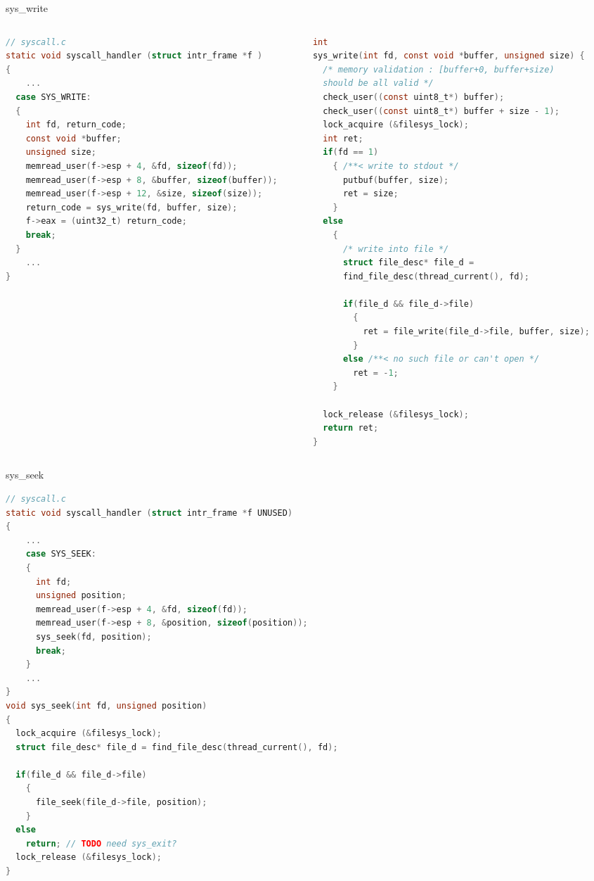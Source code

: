 \documentclass[10pt]{beamer}
\begin{document}
\begin{frame}[fragile]{sys\_write}
\begin{columns}
\begin{column}{0.5\textwidth}
\begin{lstlisting}[language=C]
// syscall.c
static void syscall_handler (struct intr_frame *f ) 
{
    ...
  case SYS_WRITE:
  {
    int fd, return_code;
    const void *buffer;
    unsigned size;
    memread_user(f->esp + 4, &fd, sizeof(fd));
    memread_user(f->esp + 8, &buffer, sizeof(buffer));
    memread_user(f->esp + 12, &size, sizeof(size));
    return_code = sys_write(fd, buffer, size);
    f->eax = (uint32_t) return_code;
    break;
  }
    ...
}
\end{lstlisting}
\end{column}
\begin{column}{0.5\textwidth}
\begin{lstlisting}[language=C]
int 
sys_write(int fd, const void *buffer, unsigned size) {
  /* memory validation : [buffer+0, buffer+size) 
  should be all valid */
  check_user((const uint8_t*) buffer);
  check_user((const uint8_t*) buffer + size - 1);
  lock_acquire (&filesys_lock);
  int ret;
  if(fd == 1) 
    { /**< write to stdout */
      putbuf(buffer, size);
      ret = size;
    }
  else 
    {
      /* write into file */
      struct file_desc* file_d = 
      find_file_desc(thread_current(), fd);

      if(file_d && file_d->file) 
        {
          ret = file_write(file_d->file, buffer, size);
        }
      else /**< no such file or can't open */
        ret = -1;
    }
  
  lock_release (&filesys_lock);
  return ret;
}
\end{lstlisting}
\end{column}
\end{columns}
\end{frame}
\begin{frame}[fragile]{sys\_seek}
    \begin{lstlisting}[language=C]
// syscall.c
static void syscall_handler (struct intr_frame *f UNUSED) 
{
    ...
    case SYS_SEEK:
    {
      int fd;
      unsigned position;
      memread_user(f->esp + 4, &fd, sizeof(fd));
      memread_user(f->esp + 8, &position, sizeof(position));
      sys_seek(fd, position);
      break;
    }
    ...
}
void sys_seek(int fd, unsigned position) 
{
  lock_acquire (&filesys_lock);
  struct file_desc* file_d = find_file_desc(thread_current(), fd);

  if(file_d && file_d->file) 
    {
      file_seek(file_d->file, position);
    }
  else
    return; // TODO need sys_exit?
  lock_release (&filesys_lock);
}
    \end{lstlisting}
\end{frame}
\end{document}
